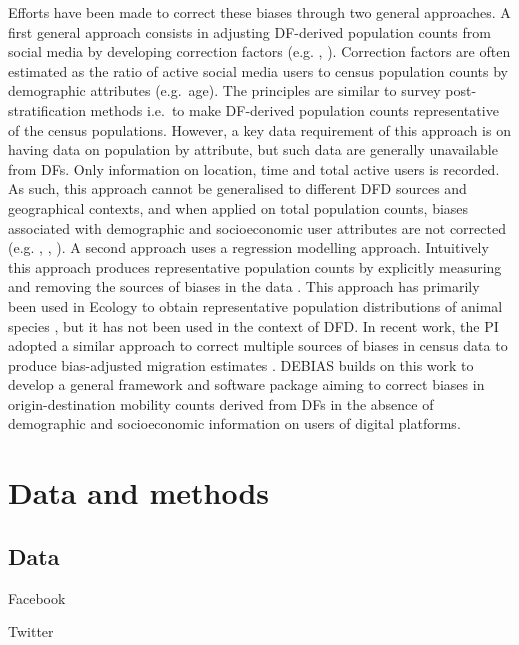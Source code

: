 \documentclass[]{rsos}%
\begin{document}
Efforts have been made to correct these biases through two general approaches. A first general approach consists in adjusting DF-derived population counts from social media by developing correction factors (e.g. \citep{yildiz17-twitter}, \citep{Hsiao24-bias}). Correction factors are often estimated as the ratio of active social media users to census population counts by demographic attributes (e.g.~age). The principles are similar to survey post-stratification methods i.e.~to make DF-derived population counts representative of the census populations. However, a key data requirement of this approach is on having data on population by attribute, but such data are generally unavailable from DFs. Only information on location, time and total active users is recorded. As such, this approach cannot be generalised to different DFD sources and geographical contexts, and when applied on total population counts, biases associated with demographic and socioeconomic user attributes are not corrected (e.g. \citep{rodriguez-carrion18-biases}, \citep{schlosser21-biases}, \citep{pak22-correcting-bias}). A second approach uses a regression modelling approach. Intuitively this approach produces representative population counts by explicitly measuring and removing the sources of biases in the data \citep{kramer-schadt13-bias-correction}. This approach has primarily been used in Ecology to obtain representative population distributions of animal species \citep{zizka21-sampbias}, but it has not been used in the context of DFD. In recent work, the PI adopted a similar approach to correct multiple sources of biases in census data to produce bias-adjusted migration estimates \citep{aparicio-castro23-bayesian}. DEBIAS builds on this work to develop a general framework and software package aiming to correct biases in origin-destination mobility counts derived from DFs in the absence of demographic and socioeconomic information on users of digital platforms.

\hypertarget{data-and-methods}{%
\section{Data and methods}\label{data-and-methods}}

\hypertarget{data}{%
\subsection{Data}\label{data}}

Facebook

Twitter
\end{document}

